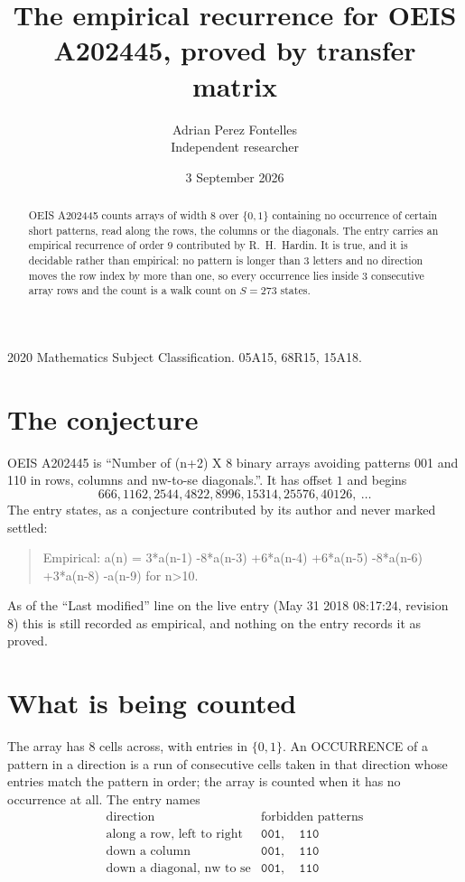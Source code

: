 \documentclass[11pt,a4paper]{article}
\title{The empirical recurrence for OEIS A202445, proved by transfer matrix}
\author{Adrian Perez Fontelles\\ \small Independent researcher}
\date{3 September 2026}
\theoremstyle{plain}
\theoremstyle{definition}
\begin{document}
\maketitle

\begin{abstract}
OEIS A202445 counts arrays of width $8$ over $\{0,1\}$ containing no occurrence of certain short
patterns, read along the rows, the columns or the diagonals. The entry carries an empirical
recurrence of order $9$ contributed by R.~H.~Hardin. It is true, and it is decidable
rather than empirical: no pattern is longer than $3$ letters and no direction moves the row
index by more than one, so every occurrence lies inside $3$ consecutive array rows and the
count is a walk count on $S=273$ states.
\end{abstract}

\noindent\small 2020 Mathematics Subject Classification. 05A15, 68R15, 15A18.\normalsize

\section{The conjecture}

OEIS A202445 is ``Number of (n+2) X 8 binary arrays avoiding patterns 001 and 110 in rows, columns and nw-to-se diagonals.''. It has offset $1$ and begins
\[
666, 1162, 2544, 4822, 8996, 15314, 25576, 40126,\ \dots
\]
The entry states, as a conjecture contributed by its author and never marked settled:
\begin{quote}
Empirical: a(n) = 3*a(n-1) -8*a(n-3) +6*a(n-4) +6*a(n-5) -8*a(n-6) +3*a(n-8) -a(n-9) for n>10.
\end{quote}
As of the ``Last modified'' line on the live entry (May 31 2018 08:17:24, revision 8) this is still
recorded as empirical, and nothing on the entry records it as proved.

\section{What is being counted}

The array has $8$ cells across, with entries in $\{0,1\}$. An OCCURRENCE of a pattern in a
direction is a run of consecutive cells taken in that direction whose entries match the pattern
in order; the array is counted when it has no occurrence at all. The entry names
\[
\begin{array}{ll}
\text{direction} & \text{forbidden patterns} \\[2pt]
\text{along a row, left to right} & \mathtt{001},\quad \mathtt{110} \\
\text{down a column} & \mathtt{001},\quad \mathtt{110} \\
\text{down a diagonal, nw to se} & \mathtt{001},\quad \mathtt{110} \\
\end{array}
\]
\end{document}
